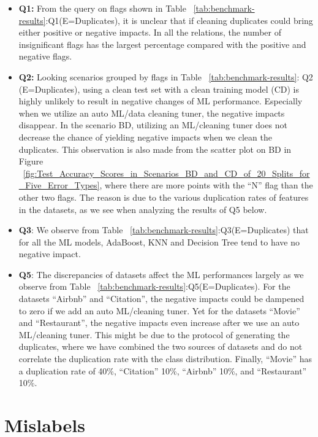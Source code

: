 \begin{itemize}
	\item {
		\textbf{Q1:} From the query on flags shown in Table ~\ref{tab:benchmark-results}:Q1(E=Duplicates),
		it is unclear that if cleaning duplicates could bring either positive
		or negative impacts. In all the relations, the number of insignificant flags has the largest percentage compared with the positive
		and negative flags.
	}
	\item{
		\textbf{Q2:} Looking scenarios grouped by flags in Table ~\ref{tab:benchmark-results}: Q2 (E=Duplicates), using a clean test set with a clean training model (CD) is highly unlikely to result in negative changes of ML performance.
		Especially when we utilize an auto ML/data cleaning tuner, the negative impacts disappear. In the scenario BD, utilizing an ML/cleaning tuner does not decrease the chance of yielding negative impacts
		when we clean the duplicates. This observation is also made from
		the scatter plot on BD in Figure ~\ref{fig:Test_Accuracy_Scores_in_Scenarios_BD_and_CD_of_20_Splits_for_Five_Error_Types}, where there are more points with the “N” flag than the other two flags. The reason is due to the various duplication rates of features in the datasets, as we see when analyzing the results of Q5 below.
	}

	\item {
		\textbf{Q3}: We observe from Table ~\ref{tab:benchmark-results}:Q3(E=Duplicates) that for all the ML models, AdaBoost, KNN and Decision Tree tend to have no negative impact.
	}
	\item {
		\textbf{Q5}: The discrepancies of datasets affect the ML performances largely as we observe from Table ~\ref{tab:benchmark-results}:Q5(E=Duplicates). For the datasets “Airbnb” and “Citation”, the negative impacts could be
		dampened to zero if we add an auto ML/cleaning tuner. Yet for the datasets “Movie” and “Restaurant”, the negative impacts even increase after we use an auto ML/cleaning tuner. This might be due to the protocol of generating the duplicates, where we have combined the two sources of datasets and do not correlate the duplication rate
		with the class distribution. Finally, “Movie” has a duplication rate of 40\%, “Citation” 10\%, “Airbnb” 10\%, and “Restaurant” 10\%.
	}
\end{itemize}

\section{Mislabels} \label{sec:mislabels}

